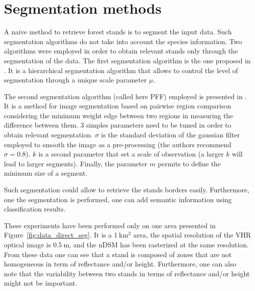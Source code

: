 \section{Segmentation methods}
A naive method to retrieve forest stands is to segment the input data. Such segmentation algorithms do not take into account the species information. Two algorithms were employed in order to obtain relevant stands only through the segmentation of the data.
The first segmentation algorithm is the one proposed in \cite{guigues2006scale}. It is a hierarchical segmentation algorithm that allows to control the level of segmentation through a unique scale parameter $\mu$.

The second segmentation algorithm (called here PFF) employed is presented in \cite{felzenszwalb2004efficient}. It is a method for image segmentation based on pairwise region comparison considering the minimum weight edge between two regions in measuring the difference between them. 3 simples parameters need to be tuned in order to obtain relevant segmentation. $\sigma$ is the standard deviation of the gaussian filter employed to smooth the image as a pre-processing (the authors recommend $\sigma=0.8$). $k$ is a second parameter that set a scale of observation (a larger $k$ will lead to larger segments). Finally, the parameter $m$ permits to define the minimum size of a segment.

Such segmentation could allow to retrieve the stands borders easily. Furthermore, one the segmentation is performed, one can add semantic information using classification results.

These experiments have been performed only on one area presented in Figure~\ref{fig:data_direct_seg}. It is a 1$\:$km$^{2}$ area, the spatial resolution of the VHR optical image is 0.5$\:$m, and the nDSM has been rasterized at the same resolution. From these data one can see that a stand is composed of zones that are not homogeneous in term of reflectance and/or height. Furthermore, one can also note that the variability between two stands in terms of reflectance and/or height might not be important.

